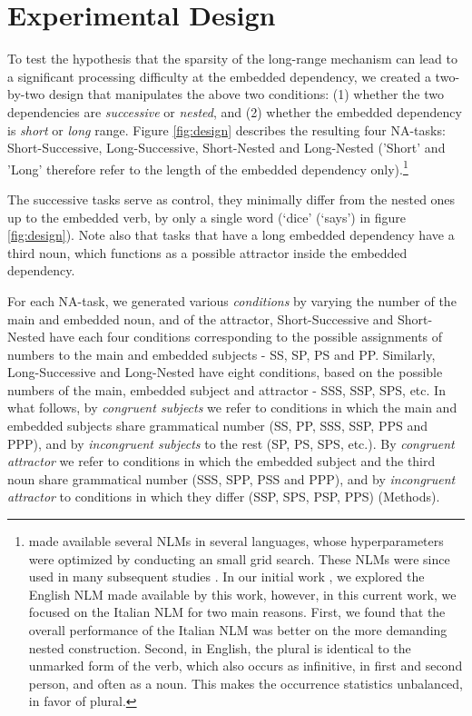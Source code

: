 \section{Experimental Design}
To test the hypothesis that the sparsity of the long-range mechanism can lead to a significant processing difficulty at the embedded dependency, we created a two-by-two design that manipulates the above two conditions: (1) whether the two dependencies are \textit{successive} or \textit{nested}, and (2) whether the embedded dependency is \textit{short} or \textit{long} range. Figure \ref{fig:design} describes the resulting four NA-tasks: Short-Successive, Long-Successive, Short-Nested and Long-Nested ('Short' and 'Long' therefore refer to the length of the embedded dependency only).\footnote{\citet{Gulordava:etal:2018} made available several NLMs in several languages, whose hyperparameters were optimized by conducting an small grid search. 
These NLMs were since used in many subsequent studies \citep{Giulianelli:etal:2018, jumelet2019analysing, wilcox2018rnn, futrell2019neural}.
In our initial work \citep{lakretz2019emergence}, we explored the English NLM made available by this work, however, in this current work, we focused on the Italian NLM for two main reasons. 
First, we found that the overall performance of the Italian NLM was better on the more demanding nested construction. Second, in English, the plural is identical to the unmarked form of the verb, which also occurs as infinitive, in first and second person, and often as a noun. This makes the occurrence statistics unbalanced, in favor of plural.} 

The successive tasks serve as control, they minimally differ from the nested ones up to the embedded verb, by only a single word (`dice' (`says') in figure \ref{fig:design}). Note also that tasks that have a long embedded dependency have a third noun, which functions as a possible attractor inside the embedded dependency.

For each NA-task, we generated various \textit{conditions} by varying the number of the main and embedded noun, and of the attractor, Short-Successive and Short-Nested have each four conditions corresponding to the possible assignments of numbers to the main and embedded subjects - SS, SP, PS and PP. Similarly, Long-Successive and Long-Nested have eight conditions, based on the possible numbers of the main, embedded subject and attractor - SSS, SSP, SPS, etc. In what follows, by \textit{congruent subjects} we refer to conditions in which the main and embedded subjects share grammatical number (SS, PP, SSS, SSP, PPS and PPP), and by \textit{incongruent subjects} to the rest (SP, PS, SPS, etc.). By \textit{congruent attractor} we refer to conditions in which the embedded subject and the third noun share grammatical number (SSS, SPP, PSS and PPP), and by \textit{incongruent attractor} to conditions in which they differ (SSP, SPS, PSP, PPS) (Methods). 

